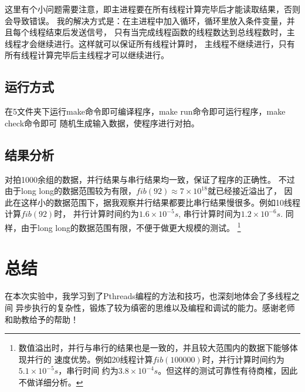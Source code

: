 \documentclass[UTF8]{article}
\begin{document}
这里有个小问题需要注意，即主进程要在所有线程计算完毕后才能读取结果，否则会导致错误。
我的解决方式是：在主进程中加入循环，循环里放入条件变量，并且每个线程结束后发送信号，
只有当完成线程函数的线程数达到总线程数时，主线程才会继续进行。这样就可以保证所有线程计算时，
主线程不继续进行，只有所有线程计算完毕后主线程才可以继续进行。




\subsection{运行方式}

在5文件夹下运行make命令即可编译程序，make run命令即可运行程序，make check命令即可
随机生成输入数据，使程序进行对拍。

\subsection{结果分析}
对拍1000余组的数据，并行结果与串行结果均一致，保证了程序的正确性。
不过由于long long的数据范围较为有限，$fib(92)\approx7\times10^{18}$就已经接近溢出了，
因此在这样小的数据范围下，据我观察并行结果都要比串行结果慢很多。例如10线程计算$fib(92)$时，
并行计算时间约为$1.6\times10^{-5}s$, 串行计算时间为$1.2\times10^{-6}s$. 
同样，由于long long的数据范围有限，不便于做更大规模的测试。
\footnote{数值溢出时，并行与串行的结果也是一致的，并且较大范围内的数据下能够体现并行的
速度优势。例如20线程计算$fib(100000)$时，并行计算时间约为$5.1\times10^{-5}s$，串行时间
约为$3.8\times10^{-4}s$。但这样的测试可靠性有待商榷，因此不做详细分析。
}


\section{总结}
在本次实验中，我学习到了Pthreads编程的方法和技巧，也深刻地体会了多线程之间
异步执行的复杂性，锻炼了较为缜密的思维以及编程和调试的能力。感谢老师和助教给予的帮助！


\end{document}
